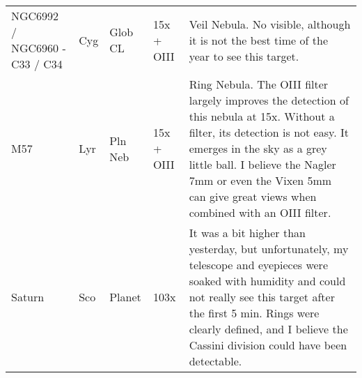 \begin{longtable}{ p{0.8in}  p{0.3in}  p{0.5in}  p{0.9in}  p{5.8in} }
NGC6992 / NGC6960 - C33 / C34 & Cyg & Glob CL & 15x + OIII & Veil Nebula. No visible, although it is not the best time of the year to see this target. \\ 
M57 & Lyr & Pln Neb & 15x + OIII & Ring Nebula. The OIII filter largely improves the detection of this nebula at 15x. Without a filter, its detection is not easy. It emerges in the sky as a grey little ball. I believe the Nagler 7mm or even the Vixen 5mm can give great views when combined with an OIII filter. \\ 
Saturn & Sco & Planet & 103x & It was a bit higher than yesterday, but unfortunately, my telescope and eyepieces were soaked with humidity and could not really see this target after the first 5 min. Rings were clearly defined, and I believe the Cassini division could have been detectable. \\ 
\hline 
\end{longtable} 
